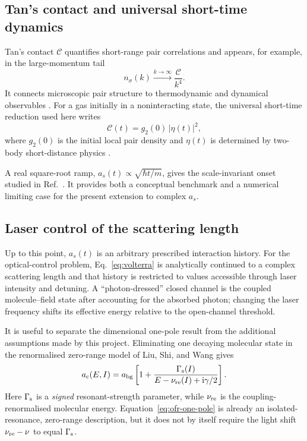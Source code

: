 \documentclass[9pt,a4paper,twocolumn,twoside]{rho-class/rho}
\newcommand{\ac}{a_{\mathrm{c}}}
\newcommand{\abg}{a_{\mathrm{bg}}}
\newcommand{\ii}{\mathrm{i}}
\begin{document}
    \subsection{Tan's contact and universal short-time dynamics}

        Tan's contact $\mathcal{C}$ quantifies short-range pair correlations and appears, for example, in the large-momentum tail
        \begin{equation}\label{eq:contact-tail}
            n_{\sigma}(k)\xrightarrow{k\rightarrow\infty}\frac{\mathcal{C}}{k^4}.
        \end{equation}
        It connects microscopic pair structure to thermodynamic and dynamical observables \cite{tan2008energetics,braaten2008exact}. For a gas initially in a noninteracting state, the universal short-time reduction used here writes
        \begin{equation}\label{eq:contact-eta}
            \mathcal{C}(t)=g_2(0)\,|\eta(t)|^2,
        \end{equation}
        where $g_2(0)$ is the initial local pair density and $\eta(t)$ is determined by two-body short-distance physics \cite{qi2021maximum}.

        A real square-root ramp, $a_s(t)\propto\sqrt{\hbar t/m}$, gives the scale-invariant onset studied in Ref.~\cite{qi2021maximum}. It provides both a conceptual benchmark and a numerical limiting case for the present extension to complex $a_s$.

    \subsection{Laser control of the scattering length}

        Up to this point, $a_s(t)$ is an arbitrary prescribed interaction
        history. For the optical-control problem, Eq.~\eqref{eq:volterra} is
        analytically continued to a complex scattering length and that history
        is restricted to values accessible through laser intensity and
        detuning. A ``photon-dressed'' closed channel is the coupled
        molecule--field state after accounting for the absorbed photon;
        changing the laser frequency shifts its effective energy relative to
        the open-channel threshold.

        It is useful to separate the dimensional one-pole result from the
        additional assumptions made by this project.  Eliminating one decaying
        molecular state in the renormalised zero-range model of Liu, Shi, and
        Wang gives \cite{liu2024weakly}
        \begin{equation}\label{eq:ofr-one-pole}
            \ac(E,I)=\abg\left[
                1+\frac{\Gamma_{\rm s}(I)}
                {E-\nu_{\rm re}(I)+\ii\gamma/2}
            \right].
        \end{equation}
        Here $\Gamma_{\rm s}$ is a \emph{signed} resonant-strength parameter,
        while $\nu_{\rm re}$ is the coupling-renormalised molecular energy.
        Equation~\eqref{eq:ofr-one-pole} is already an isolated-resonance,
        zero-range description, but it does not by itself require the light
        shift $\nu_{\rm re}-\nu$ to equal $\Gamma_{\rm s}$.
\end{document}
